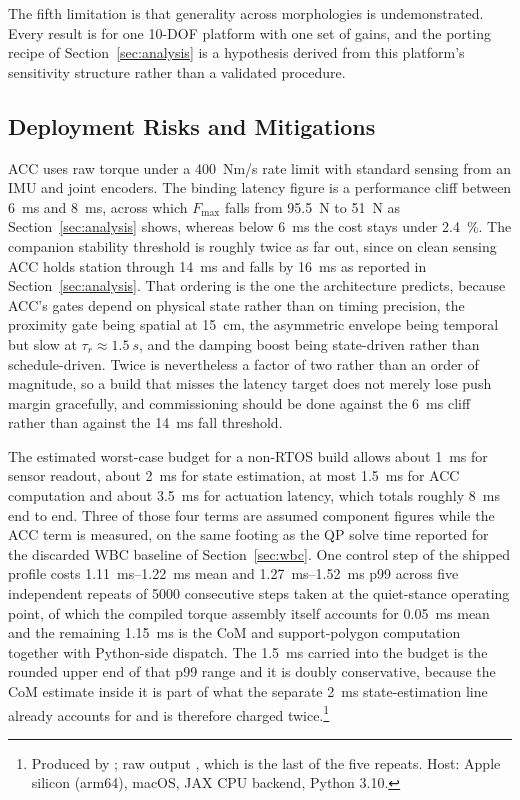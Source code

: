\documentclass[a4paper,fleqn]{cas-dc}
\begin{document}
The fifth limitation is that generality across morphologies is undemonstrated.
Every result is for one 10-DOF platform with one set of gains, and the porting
recipe of Section~\ref{sec:analysis} is a hypothesis derived from this
platform's sensitivity structure rather than a validated procedure.

\subsection{Deployment Risks and Mitigations}

ACC uses raw torque under a \SI{400}{Nm/s} rate limit with standard sensing from
an IMU and joint encoders. The binding latency figure is a performance cliff
between \SI{6}{ms} and \SI{8}{ms}, across which $F_{\max}$ falls from
\SI{95.5}{N} to \SI{51}{N} as Section~\ref{sec:analysis} shows, whereas below
\SI{6}{ms} the cost stays under \SI{2.4}{\percent}. The companion stability
threshold is roughly twice as far out, since on clean sensing ACC holds station
through \SI{14}{ms} and falls by \SI{16}{ms} as reported in
Section~\ref{sec:analysis}. That ordering is the one the architecture predicts,
because ACC's gates depend on physical state rather than on timing precision,
the proximity gate being spatial at \SI{15}{cm}, the asymmetric envelope being
temporal but slow at $\tau_r{\approx}\SI{1.5}{s}$, and the damping boost being
state-driven rather than schedule-driven. Twice is nevertheless a factor of two
rather than an order of magnitude, so a build that misses the latency target
does not merely lose push margin gracefully, and commissioning should be done
against the \SI{6}{ms} cliff rather than against the \SI{14}{ms} fall threshold.

The estimated worst-case budget for a non-RTOS build allows about \SI{1}{ms} for
sensor readout, about \SI{2}{ms} for state estimation, at most \SI{1.5}{ms} for
ACC computation and about \SI{3.5}{ms} for actuation latency, which totals
roughly \SI{8}{ms} end to end. Three of those four terms are assumed component
figures while the ACC term is measured, on the same footing as the QP solve time
reported for the discarded WBC baseline of Section~\ref{sec:wbc}. One control
step of the shipped profile costs \SIrange{1.11}{1.22}{ms} mean and
\SIrange{1.27}{1.52}{ms} p99 across five independent repeats of \num{5000}
consecutive steps taken at the quiet-stance operating point, of which the
compiled torque assembly itself accounts for \SI{0.05}{ms} mean and the
remaining \SI{1.15}{ms} is the CoM and support-polygon computation together with
Python-side dispatch. The \SI{1.5}{ms} carried into the budget is the rounded
upper end of that p99 range and it is doubly conservative, because the CoM
estimate inside it is part of what the separate \SI{2}{ms} state-estimation line
already accounts for and is therefore charged twice.\footnote{Produced by
; raw output
, which is the last of
the five repeats. Host: Apple silicon (arm64), macOS, JAX CPU backend, Python
3.10.}
\end{document}
